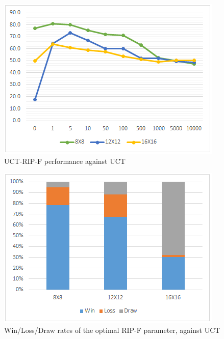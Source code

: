 \documentclass[conference]{IEEEtran}
\begin{document}
\begin{figure}[!h]
\begin{center}
	\includegraphics[scale=0.7]{figs/PT-UCT-RIP-F.png}
	\caption{UCT-RIP-F performance against UCT}
	\label{PT-UCT-RIP-F}
\end{center}
\end{figure}

\begin{figure}[!h]
\begin{center}
	\includegraphics[scale=0.7]{figs/WLDRate-UCT-RIP-F.png}
	\caption{Win/Loss/Draw rates of the optimal RIP-F parameter, against UCT }
	\label{PT-UCT-RIP-F}
\end{center}
\end{figure}
\end{document}
